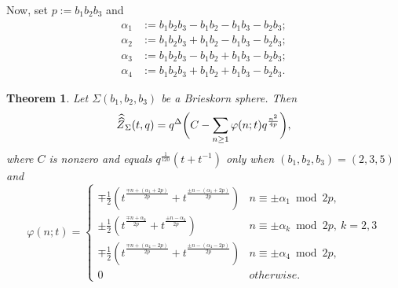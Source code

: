 \documentclass[11pt,letterpaper]{amsart}
\newtheorem{theorem}{Theorem}[section]
\theoremstyle{definition}
\theoremstyle{plain}
\newcommand{\Zhathat}{\widehat{\vphantom{\rule{5pt}{10pt}}\smash{\widehat{Z}}\,}\!}
\numberwithin{equation}{section}
\theoremstyle{example}
\begin{document}
Now, set $p:= b_{1}b_{2}b_{3}$ and
\begin{align*}
\alpha_1 &:=b_1b_2b_3 - b_1b_2 -b_1b_3 - b_2b_3; \\
\alpha_2 &:=b_1b_2b_3 + b_1b_2 -b_1b_3 - b_2b_3; \\
\alpha_3 &:=b_1b_2b_3 - b_1b_2 + b_1b_3 - b_2b_3; \\
\alpha_4 &:=b_1b_2b_3 + b_1b_2 + b_1b_3 - b_2b_3.
\end{align*} 

\begin{theorem} \label{thm: q-series} Let $\Sigma(b_{1},b_{2},b_{3})$ be a Brieskorn sphere. Then 
\[\Zhathat_\Sigma(t,q) = q^\Delta \bigg( C - \sum_{n \geq 1} \varphi(n;t)q^\frac{n^2}{4p} \bigg),\]
where $C$ is nonzero and equals $q^{\frac{1}{120}}(t+t^{-1})$ only when $(b_{1},b_{2},b_{3})=(2,3,5)$ and
\[\varphi(n;t) = \begin{cases}
\mp \frac{1}{2}(t^{\frac{\mp n + (\alpha_1+2p)}{2p}} + t^{\frac{\pm n - (\alpha_1+2p)}{2p}}) & n \equiv \pm \alpha_1 \bmod{2p},  \\
\pm \frac{1}{2}(t^\frac{\mp n + \alpha_k}{2p} + t^{\frac{\pm n - \alpha_k}{2p}}) & n \equiv \pm \alpha_k \bmod{2p}, \ k=2,3\\
\mp \frac{1}{2}(t^{\frac{\mp n + (\alpha_4-2p)}{2p}} + t^{\frac{\pm n - (\alpha_4-2p)}{2p}}) & n \equiv \pm \alpha_4 \bmod{2p}, \\ 
0 & otherwise. 
\end{cases}\]
\end{theorem}
\end{document}
